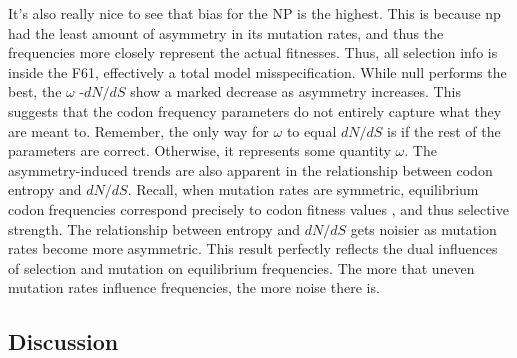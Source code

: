 \documentclass[11pt]{article}
\begin{document}
It's also really nice to see that bias for the NP is the highest. This is because np had the least amount of asymmetry in its mutation rates, and thus the frequencies more closely represent the actual fitnesses. Thus, all selection info is inside the F61, effectively a total model misspecification.
While null performs the best, the $\omega$ -$dN/dS$ show a marked decrease as asymmetry increases. This suggests that the codon frequency parameters do not entirely capture what they are meant to. Remember, the only way for $\omega$ to equal $dN/dS$ is if the rest of the parameters are correct. Otherwise, it represents some quantity $\omega$.
The asymmetry-induced trends are also apparent in the relationship between codon entropy and $dN/dS$. Recall, when mutation rates are symmetric, equilibrium codon frequencies correspond precisely to codon fitness values \cite{SellaHirsh2005}, and thus selective strength. The relationship between entropy and $dN/dS$ gets noisier as mutation rates become more asymmetric. This result perfectly reflects the dual influences of selection and mutation on equilibrium frequencies. The more that uneven mutation rates influence frequencies, the more noise there is. 


\subsection*{Discussion}

\end{document}
